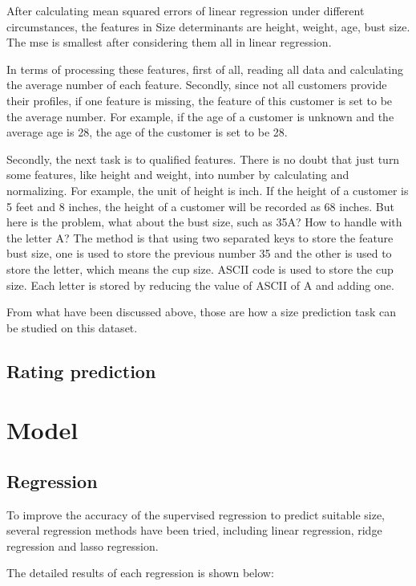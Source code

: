 \documentclass[letterpaper, 10 pt, conference]{ieeeconf}  %
\begin{document}
After calculating mean squared errors of linear regression under different circumstances, the features in Size determinants are height, weight, age, bust size. The mse is smallest after considering them all in linear regression. 

In terms of processing these features, first of all, reading all data and calculating the average number of each feature. Secondly, since not all customers provide their profiles, if one feature is missing, the feature of this customer is set to be the average number. For example, if the age of a customer is unknown and the average age is 28, the age of the customer is set to be 28.

Secondly, the next task is to qualified features. There is no doubt that just turn some features, like height and weight, into number by calculating and normalizing. For example, the unit of height is inch. If the height of a customer is 5 feet and 8 inches, the height of a customer will be recorded as 68 inches. But here is the problem, what about the bust size, such as 35A? How to handle with the letter A? 
The method is that using two separated keys to store the feature bust size, one is used to store the previous number 35 and the other is used to store the letter, which means the cup size. ASCII code is used to store the cup size. Each letter is stored by reducing the value of ASCII of A and adding one.  

From what have been discussed above, those are how a size prediction task can be studied on this dataset. 

\subsection{Rating prediction}



\section{Model}
\subsection{Regression}
To improve the accuracy of the supervised regression to predict suitable size, several regression methods have been tried, including linear regression, ridge regression and lasso regression. 

The detailed results of each regression is shown below:
\end{document}
